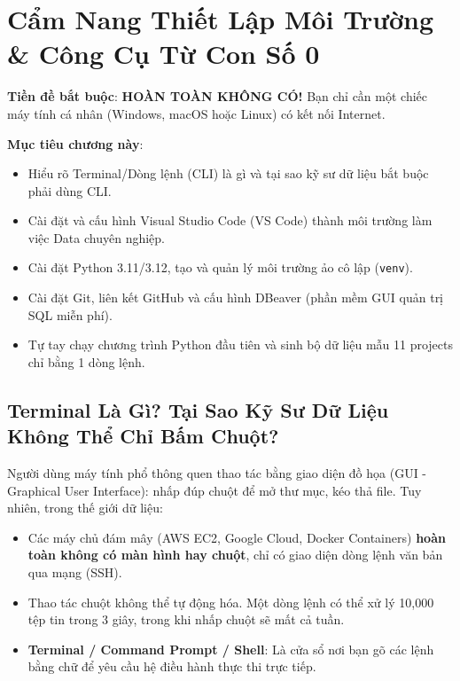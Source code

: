 \chapter{Cẩm Nang Thiết Lập Môi Trường \& Công Cụ Từ Con Số 0}

\begin{lythuyetbox}
\textbf{Tiền đề bắt buộc}: \textbf{HOÀN TOÀN KHÔNG CÓ!} Bạn chỉ cần một chiếc máy tính cá nhân (Windows, macOS hoặc Linux) có kết nối Internet.

\textbf{Mục tiêu chương này}:
\begin{itemize}
    \item Hiểu rõ Terminal/Dòng lệnh (CLI) là gì và tại sao kỹ sư dữ liệu bắt buộc phải dùng CLI.
    \item Cài đặt và cấu hình Visual Studio Code (VS Code) thành môi trường làm việc Data chuyên nghiệp.
    \item Cài đặt Python 3.11/3.12, tạo và quản lý môi trường ảo cô lập (\texttt{venv}).
    \item Cài đặt Git, liên kết GitHub và cấu hình DBeaver (phần mềm GUI quản trị SQL miễn phí).
    \item Tự tay chạy chương trình Python đầu tiên và sinh bộ dữ liệu mẫu 11 projects chỉ bằng 1 dòng lệnh.
\end{itemize}
\end{lythuyetbox}

\section{Terminal Là Gì? Tại Sao Kỹ Sư Dữ Liệu Không Thể Chỉ Bấm Chuột?}

Người dùng máy tính phổ thông quen thao tác bằng giao diện đồ họa (GUI - Graphical User Interface): nhấp đúp chuột để mở thư mục, kéo thả file. Tuy nhiên, trong thế giới dữ liệu:
\begin{itemize}
    \item Các máy chủ đám mây (AWS EC2, Google Cloud, Docker Containers) \textbf{hoàn toàn không có màn hình hay chuột}, chỉ có giao diện dòng lệnh văn bản qua mạng (SSH).
    \item Thao tác chuột không thể tự động hóa. Một dòng lệnh có thể xử lý 10,000 tệp tin trong 3 giây, trong khi nhấp chuột sẽ mất cả tuần.
    \item \textbf{Terminal / Command Prompt / Shell}: Là cửa sổ nơi bạn gõ các lệnh bằng chữ để yêu cầu hệ điều hành thực thi trực tiếp.
\end{itemize}


